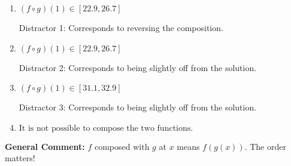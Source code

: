 \documentclass{extbook}[14pt]
\begin{document}
\begin{enumerate}
{\begin{enumerate}[label=\Alph*.]
* This is the correct solution
\item \( (f \circ g)(1) \in [22.9, 26.7] \)

 Distractor 1: Corresponds to reversing the composition.
\item \( (f \circ g)(1) \in [22.9, 26.7] \)

 Distractor 2: Corresponds to being slightly off from the solution.
\item \( (f \circ g)(1) \in [31.1, 32.9] \)

 Distractor 3: Corresponds to being slightly off from the solution.
\item \( \text{It is not possible to compose the two functions.} \)


\end{enumerate}

\textbf{General Comment:} $f$ composed with $g$ at $x$ means $f(g(x))$. The order matters!
}
\end{enumerate}
\end{document}
